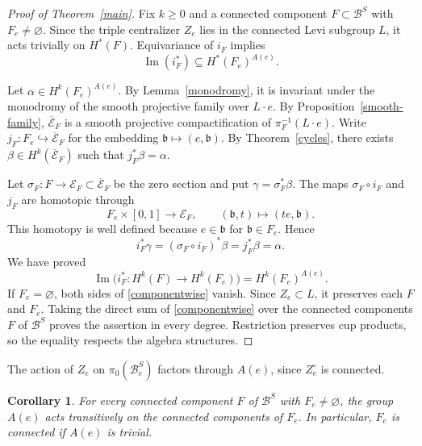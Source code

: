 \documentclass[12pt]{article}
\theoremstyle{paperplain}
\newtheorem{corollary}[theorem]{Corollary}
\DeclareMathOperator{\im}{Im}
\newcommand{\B}{\mathcal B}
\begin{document}
\begin{proof}[Proof of Theorem~\ref{main}]
    Fix $k\ge0$ and a connected component $F\subset\B^S$ with $F_e\ne\varnothing$. Since the triple centralizer $Z_e$ lies in the connected Levi subgroup $L$, it acts trivially on $H^*(F)$. Equivariance of $i_F$ implies
    \[
        \im(i_F^*)\subseteq H^*(F_e)^{A(e)}.
    \]

    Let $\alpha\in H^k(F_e)^{A(e)}$. By Lemma~\ref{monodromy}, it is invariant under the monodromy of the smooth projective family over $L\cdot e$. By Proposition~\ref{smooth-family}, $\overline{\mathcal E}_F$ is a smooth projective compactification of $\pi_F^{-1}(L\cdot e)$. Write $j_F\colon F_e\hookrightarrow\overline{\mathcal E}_F$ for the embedding $\mathfrak b\mapsto(e,\mathfrak b)$. By Theorem~\ref{cycles}, there exists $\beta\in H^k(\overline{\mathcal E}_F)$ such that $j_F^*\beta=\alpha$.

    Let $\sigma_F\colon F\to\mathcal E_F\subset\overline{\mathcal E}_F$ be the zero section and put $\gamma=\sigma_F^*\beta$. The maps $\sigma_F\circ i_F$ and $j_F$ are homotopic through
    \[
        F_e\times[0,1]\longrightarrow\mathcal E_F,\qquad
        (\mathfrak b,t)\longmapsto(te,\mathfrak b).
    \]
    This homotopy is well defined because $e\in\mathfrak b$ for $\mathfrak b\in F_e$. Hence
    \[
        i_F^*\gamma=(\sigma_F\circ i_F)^*\beta
            =j_F^*\beta=\alpha.
    \]
    We have proved
    \begin{equation}\label{componentwise}
        \im\bigl(i_F^*\colon H^k(F)\longrightarrow H^k(F_e)\bigr)
            =H^k(F_e)^{A(e)}.
    \end{equation}
    If $F_e=\varnothing$, both sides of \eqref{componentwise} vanish. Since $Z_e\subset L$, it preserves each $F$ and $F_e$. Taking the direct sum of \eqref{componentwise} over the connected components $F$ of $\B^S$ proves the assertion in every degree. Restriction preserves cup products, so the equality respects the algebra structures.\qedhere
\end{proof}

The action of $Z_e$ on $\pi_0(\B_e^S)$ factors through $A(e)$, since $Z_e^\circ$ is connected.

\begin{corollary}\label{transitive}
    For every connected component $F$ of $\B^S$ with $F_e\ne\varnothing$, the group $A(e)$ acts transitively on the connected components of $F_e$. In particular, $F_e$ is connected if $A(e)$ is trivial.
\end{corollary}
\end{document}
